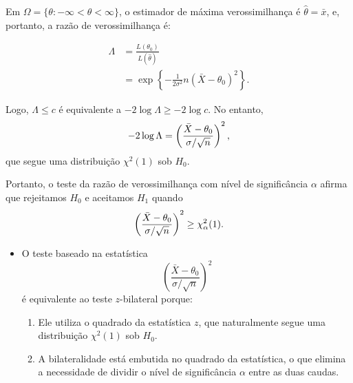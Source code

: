\documentclass[12pt]{beamer}
\begin{document}
\begin{frame}{}
	\begin{block}{}
		\justifying
		Em $\Omega = \{\theta : -\infty < \theta < \infty\}$, o estimador de máxima verossimilhança é $\hat{\theta} = \bar{x}$, e, portanto, a razão de verossimilhança é:
		
		\[
		\begin{aligned}
			\Lambda &= \frac{L(\theta_0)}{L(\hat{\theta})} \\
			&= \exp\left\{ -\frac{1}{2\sigma^2}n(\bar{X} - \theta_0)^2 \right\}.
		\end{aligned}
		\]
	\end{block}
	\pause
	\begin{block}{}
		\justifying
		Logo, $\Lambda \leq c$ é equivalente a $-2 \log \Lambda \geq -2 \log c$. No entanto, 
		\[
		-2 \log \Lambda = \left(\frac{\Bar{X} - \theta_0}{\sigma/\sqrt{n}}\right)^{2},
		\]
		que segue uma distribuição $\chi^2(1)$ sob $H_0$. 
	\end{block}
\end{frame}


\begin{frame}{}
	\begin{block}{}
		\justifying
		Portanto, o teste da razão de verossimilhança com nível de significância $\alpha$ afirma que rejeitamos $H_0$ e aceitamos $H_1$ quando
		\[
		\left(\frac{\Bar{X} - \theta_0}{\sigma/\sqrt{n}}\right)^{2} \geq \chi^2_\alpha(1).
		\]
		
	\end{block}
	\pause
		\begin{block}{}
		
		\begin{itemize}
			\justifying
			\item O teste baseado na estatística
			\[
			\left(\frac{\bar{X} - \theta_0}{\sigma / \sqrt{n}}\right)^2
			\]
			é equivalente ao teste \(z\)-bilateral porque:
			\begin{enumerate}
				\justifying
				\item Ele utiliza o quadrado da estatística \(z\), que naturalmente segue uma distribuição \(\chi^2(1)\) sob \(H_0\).\pause
				\item A bilateralidade está embutida no quadrado da estatística, o que elimina a necessidade de dividir o nível de significância \(\alpha\) entre as duas caudas.
			\end{enumerate}
		\end{itemize}
	\end{block}
\end{frame}
\end{document}
